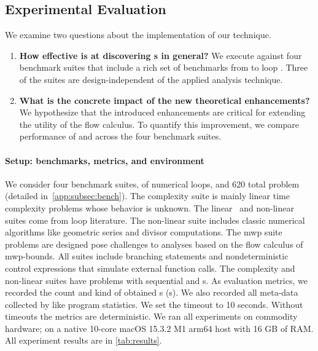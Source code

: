 \subsection{Experimental Evaluation}
\label{sec:performance}

We examine two questions about the implementation of our technique.

\begin{enumerate}

    \item \textbf{How effective is \ndx{\impl} at discovering
    s in general?}
    We execute \ndx{\impl} against four benchmark suites that include a rich set
    of benchmarks from  to loop
    . Three of the suites are design-independent of the
    applied analysis technique.

    \item \textbf{What is the concrete impact of the new theoretical
    enhancements?}
    We hypothesize that the introduced enhancements are critical for extending
    the utility of the flow calculus. To quantify this
    improvement, we compare performance of \ndx{\impl} and \ndx{\impf} across
    the four benchmark suites.

\end{enumerate}

\paragraph*{Setup: benchmarks, metrics, and environment}
\label{subsec:exp-setup}
We consider four benchmark suites, of numerical  loops, and 620 total problem (detailed in~\autoref{app:subsec:bench}). The
{complexity} suite is mainly linear time complexity problems whose
 behavior is unknown. The
{linear}~\cite{si2018} and
{non-linear}~\cite{nguyen2017,yu2023} suites come
from loop  literature. The
non-linear suite includes classic numerical algorithms like geometric series and
divisor computations. The {mwp} suite~\cite{aubert2023b} problems are designed
pose challenges to analyses based on the flow calculus of
mwp-bounds. All suites include branching statements and
nondeterministic control expressions that simulate
external function calls. The complexity and non-linear suites have problems with
sequential and s. As evaluation metrics, we recorded the count
and kind of obtained s (\ie {}s). We also
recorded all meta-data collected by  like program statistics. We set
the timeout to 10 seconds. Without timeouts the metrics are deterministic. We
ran all experiments on commodity hardware; on a native 10-core macOS 15.3.2 M1
arm64 host with 16 GB of RAM\@. All experiment results are in
\autoref{tab:results}.

